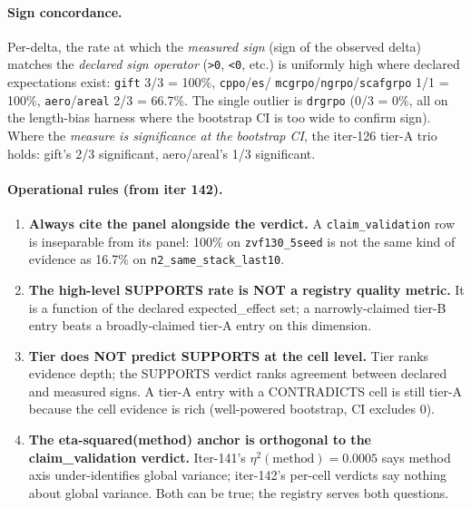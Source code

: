 \paragraph{Sign concordance.}
Per-delta, the rate at which the \emph{measured sign} (sign of the
observed delta) matches the \emph{declared sign operator}
(\texttt{>0}, \texttt{<0}, etc.) is uniformly high where declared
expectations exist: \texttt{gift} 3/3 = 100\%, \texttt{cppo}/\texttt{es}/
\texttt{mcgrpo}/\texttt{ngrpo}/\texttt{scafgrpo} 1/1 = 100\%,
\texttt{aero}/\texttt{areal} 2/3 = 66.7\%.  The single outlier is
\texttt{drgrpo} (0/3 = 0\%, all on the length-bias harness where the
bootstrap CI is too wide to confirm sign).  Where the \emph{measure is
significance at the bootstrap CI}, the iter-126 tier-A trio holds:
gift's 2/3 significant, aero/areal's 1/3 significant.

\paragraph{Operational rules (from iter 142).}
\begin{enumerate}
\item \textbf{Always cite the panel alongside the verdict.} A
\texttt{claim\_validation} row is inseparable from its panel: 100\% on
\texttt{zvf130\_5seed} is not the same kind of evidence as 16.7\% on
\texttt{n2\_same\_stack\_last10}.
\item \textbf{The high-level SUPPORTS rate is NOT a registry quality
metric.} It is a function of the declared expected\_effect set; a
narrowly-claimed tier-B entry beats a broadly-claimed tier-A entry on
this dimension.
\item \textbf{Tier does NOT predict SUPPORTS at the cell level.} Tier
ranks evidence depth; the SUPPORTS verdict ranks agreement between
declared and measured signs.  A tier-A entry with a CONTRADICTS cell is
still tier-A because the cell evidence is rich (well-powered bootstrap,
CI excludes 0).
\item \textbf{The eta-squared(method) anchor is orthogonal to the
claim\_validation verdict.} Iter-141's $\eta^2(\text{method}) = 0.0005$
says method axis under-identifies global variance; iter-142's per-cell
verdicts say nothing about global variance.  Both can be true; the
registry serves both questions.
\end{enumerate}

